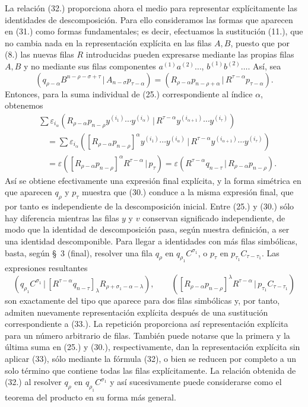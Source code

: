 \documentclass[11pt]{article}
\newcommand{\pair}[2]{(#1\,|\,#2)}
\newcommand{\eps}{\varepsilon}
\begin{document}
La relación (32.) proporciona ahora el medio para representar explícitamente las identidades de descomposición. Para ello consideramos las formas que aparecen en (31.) como formas fundamentales; es decir, efectuamos la sustitución (11.), que no cambia nada en la representación explícita en las filas $A,B$, puesto que por (8.) las nuevas filas $R$ introducidas pueden expresarse mediante las propias filas $A,B$ y no mediante sus filas componentes $a^{(1)}a^{(2)}\ldots$, $b^{(1)}b^{(2)}\ldots$. Así, sea
\begin{equation}
 \pair{q_{\rho-\alpha}B^{n-\rho-\sigma+\tau}}{A_{n-\sigma}p_{\tau-\alpha}}
 =\pair{R_{\rho-\alpha}p_{n-\rho+\alpha}}{R^{\tau-\alpha}p_{\tau-\alpha}}.
\tag{33}
\end{equation}
Entonces, para la suma individual de (25.) correspondiente al índice $\alpha$, obtenemos
\begin{equation}
\begin{aligned}
&\sum \eps_{i_\alpha}\pair{R_{\rho-\alpha}p_{n-\rho}y^{(i_1)}\cdots y^{(i_\alpha)}}{R^{\tau-\alpha}y^{(i_{\alpha+1})}\cdots y^{(i_\tau)}}\\
&\quad=\sum \eps_{i_\alpha}\pair{[R_{\rho-\alpha}p_{n-\rho}]^\alpha y^{(i_1)}\cdots y^{(i_\alpha)}}{R^{\tau-\alpha}y^{(i_{\alpha+1})}\cdots y^{(i_\tau)}}\\
&\quad=\eps\pair{[R_{\rho-\alpha}p_{n-\rho}]^\alpha R^{\tau-\alpha}}{p_\tau}
 =\eps\pair{R^{\tau-\alpha}q_{n-\tau}}{R_{\rho-\alpha}p_{n-\rho}}.
\end{aligned}
\tag{34}
\end{equation}
Así se obtiene efectivamente una expresión final explícita, y la forma simétrica en que aparecen $q_\rho$ y $p_\tau$ muestra que (30.) conduce a la misma expresión final, que por tanto es independiente de la descomposición inicial. Entre (25.) y (30.) sólo hay diferencia mientras las filas $y$ y $v$ conservan significado independiente, de modo que la identidad de descomposición pasa, según nuestra definición, a ser una identidad descomponible. Para llegar a identidades con más filas simbólicas, basta, según \S\ 3 (final), resolver una fila $q_\rho$ en $q_{\rho_1}C^{\sigma_1}$, o $p_\tau$ en $p_{\tau_1}C_{\tau-\tau_1}$. Las expresiones resultantes
\begin{equation}
 \pair{q_{\rho_1}C^{\sigma_1}}{[R^{\tau-\alpha}q_{n-\tau}]_\lambda R_{\rho+\sigma_1-\alpha-\lambda}},
 \qquad
 \pair{[R_{\rho-\alpha}p_{n-\rho}]^\lambda R^{\tau-\alpha}}{p_{\tau_1}C_{\tau-\tau_1}}
\tag{35}
\end{equation}
son exactamente del tipo que aparece para dos filas simbólicas y, por tanto, admiten nuevamente representación explícita después de una sustitución correspondiente a (33.). La repetición proporciona así representación explícita para un número arbitrario de filas. También puede notarse que la primera y la última suma en (25.) y (30.), respectivamente, dan la representación explícita sin aplicar (33), sólo mediante la fórmula (32), o bien se reducen por completo a un solo término que contiene todas las filas explícitamente. La relación obtenida de (32.) al resolver $q_\rho$ en $q_{\rho_1}C^{\sigma_1}$ y así sucesivamente puede considerarse como el teorema del producto en su forma más general.
\end{document}
